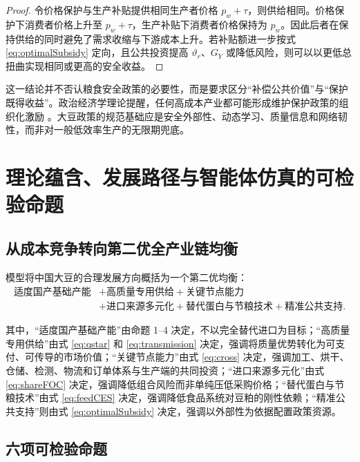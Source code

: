 \documentclass[UTF8,zihao=-4,fontset=fandol]{ctexart}
\numberwithin{equation}{section}
\theoremstyle{definition}
\theoremstyle{remark}
\begin{document}
\begin{proof}
令价格保护与生产补贴提供相同生产者价格 $p_w+\tau$，则供给相同。价格保护下消费者价格上升至 $p_w+\tau$，生产补贴下消费者价格保持为 $p_w$。因此后者在保持供给的同时避免了需求收缩与下游成本上升。若补贴额进一步按式 \eqref{eq:optimalSubsidy} 定向，且公共投资提高 $\vartheta_r$、$G_Y$ 或降低风险，则可以以更低总扭曲实现相同或更高的安全收益。\end{proof}

这一结论并不否认粮食安全政策的必要性，而是要求区分“补偿公共价值”与“保护既得收益”。政治经济学理论提醒，任何高成本产业都可能形成维护保护政策的组织化激励 \parencite{GrossmanHelpman1994}。大豆政策的规范基础应是安全外部性、动态学习、质量信息和网络韧性，而非对一般低效率生产的无限期兜底。

\section{理论蕴含、发展路径与智能体仿真的可检验命题}

\subsection{从成本竞争转向第二优全产业链均衡}

模型将中国大豆的合理发展方向概括为一个第二优均衡：
\begin{equation}
\begin{aligned}
 \text{适度国产基础产能}
 &+\text{高质量专用供给}
 +\text{关键节点能力}\\
 &+\text{进口来源多元化}
 +\text{替代蛋白与节粮技术}
 +\text{精准公共支持}.
\end{aligned}
\label{eq:strategy}
\end{equation}

其中，“适度国产基础产能”由命题 1--4 决定，不以完全替代进口为目标；“高质量专用供给”由式 \eqref{eq:qstar} 和 \eqref{eq:transmission} 决定，强调将质量优势转化为可支付、可传导的市场价值；“关键节点能力”由式 \eqref{eq:cross} 决定，强调加工、烘干、仓储、检测、物流和订单体系与生产端的共同投资；“进口来源多元化”由式 \eqref{eq:shareFOC} 决定，强调降低组合风险而非单纯压低采购价格；“替代蛋白与节粮技术”由式 \eqref{eq:feedCES} 决定，强调降低食品系统对豆粕的刚性依赖；“精准公共支持”则由式 \eqref{eq:optimalSubsidy} 决定，强调以外部性为依据配置政策资源。

\subsection{六项可检验命题}
\end{document}
